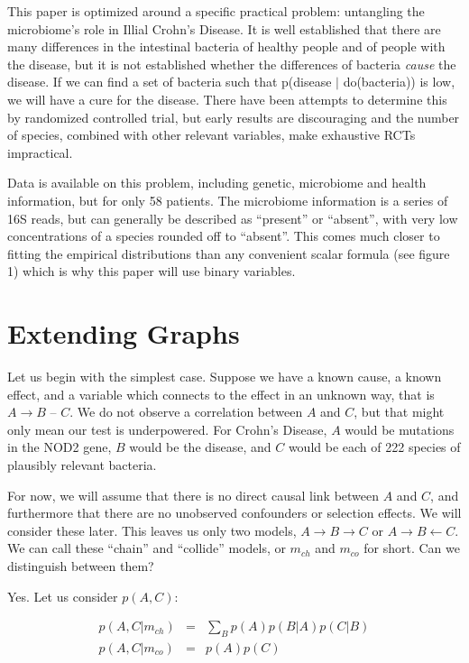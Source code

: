 \documentclass[twocolumn,12pt]{article}
\begin{document}
This paper is optimized around a specific practical problem:
untangling the microbiome's role in Illial Crohn's Disease.  It is
well established that there are many differences in the intestinal
bacteria of healthy people and of people with the disease\cite{hofer}, but it is
not established whether the differences of bacteria \textit{cause} the
disease.  If we can find a set of bacteria such that
p(disease $|$ do(bacteria)) is low, we will have a cure for the disease.
There have been attempts to determine this by randomized controlled
trial, but early results are discouraging\cite{rctma} and the number
of species, combined with other relevant
variables, make exhaustive RCTs impractical.

Data is available on this problem\cite{data}, including genetic, microbiome and
health information, but for only 58 patients.  The microbiome
information is a series of 16S reads, but can generally be described
as ``present'' or ``absent'', with very low concentrations of a
species rounded off to ``absent''.  This comes much closer to fitting
the empirical distributions than any convenient scalar formula (see
figure 1) which is why this paper will use binary variables.

\section{Extending Graphs}

Let us begin with the simplest case.  Suppose we have a known cause, a
known effect, and a variable which connects to the effect in an
unknown way, that is $A \rightarrow B$ -- $C$.  We do not observe a
correlation between $A$ and $C$, but that might only mean our test is
underpowered.  For Crohn's Disease, $A$ would be mutations in the NOD2
gene\cite{nod2}, $B$ would be the disease, and $C$ would be each of 222
species of plausibly relevant bacteria.

For now, we will assume that there is no direct causal
link between $A$ and $C$, and furthermore that there are no unobserved
confounders or selection effects.  We will consider these later.
This leaves us only two models, $A \rightarrow B \rightarrow C$ or $A
\rightarrow B \leftarrow C$.  We can call these ``chain'' and
``collide'' models, or $m_{ch}$ and $m_{co}$ for short.  Can we
distinguish between them?

Yes.  Let us consider
$p(A,C)$:

\begin{eqnarray*}
p(A,C|m_{ch}) & = & \sum_B p(A)p(B|A)p(C|B) \\
p(A,C|m_{co}) & = & p(A)p(C)
\end{eqnarray*}
\end{document}
